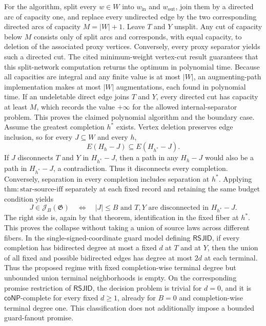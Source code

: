 For the algorithm, split every \(w\in W\) into \(w_{\mathrm{in}}\) and \(w_{\mathrm{out}}\), join them by a directed arc of capacity one, and replace every undirected edge by the two corresponding directed arcs of capacity \(M=|W|+1\).  Leave \(T\) and \(Y\) unsplit.  Any cut of capacity below \(M\) consists only of split arcs and corresponds, with equal capacity, to deletion of the associated proxy vertices.  Conversely, every proxy separator yields such a directed cut.  The cited minimum-weight vertex-cut result guarantees that this split-network computation returns the optimum in polynomial time.  Because all capacities are integral and any finite value is at most \(|W|\), an augmenting-path implementation makes at most \(|W|\) augmentations, each found in polynomial time.  If an undeletable direct edge joins \(T\) and \(Y\), every directed cut has capacity at least \(M\), which records the value \(+\infty\) for the allowed internal-separator problem.  This proves the claimed polynomial algorithm and the boundary case.
Assume the greatest completion \(h^*\) exists.  Vertex deletion preserves edge inclusion, so for every \(J\subseteq W\) and every \(h\),
\[
 E(H_h-J)\subseteq E(H_{h^*}-J).
\]
If \(J\) disconnects \(T\) and \(Y\) in \(H_{h^*}-J\), then a path in any \(H_h-J\) would also be a path in \(H_{h^*}-J\), a contradiction.  Thus it disconnects every completion.  Conversely, separation in every completion includes separation at \(h^*\).  Applying \(\mathrm{thm{:}star\text{-}source\text{-}iff}\) separately at each fixed record and retaining the same budget condition yields
\[
 J\in\mathcal J_B(\mathfrak G)
 \quad\Longleftrightarrow\quad
 |J|\le B\text{ and }T,Y\text{ are disconnected in }H_{h^*}-J.
\]
The right side is, again by that theorem, identification in the fixed fiber at \(h^*\).  This proves the collapse without taking a union of source laws across different fibers.
In the single-signed-coordinate guard model defining \(\mathsf{RSJID}\), if every completion has bidirected degree at most a fixed \(d\) at \(T\) and at \(Y\), then the union of all fixed and possible bidirected edges has degree at most \(2d\) at each terminal. Thus the proposed regime with fixed completion-wise terminal degree but unbounded union terminal neighborhoods is empty. On the corresponding promise restriction of \(\mathsf{RSJID}\), the decision problem is trivial for \(d=0\), and it is \(\mathsf{coNP}\)-complete for every fixed \(d\ge1\), already for \(B=0\) and completion-wise terminal degree one. This classification does not additionally impose a bounded guard-fanout promise.
